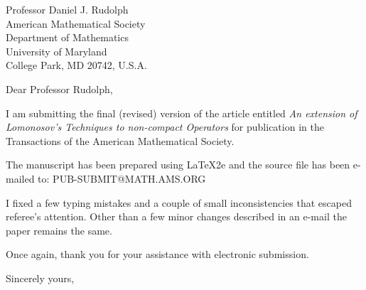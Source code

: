 \documentclass[12pt]{letter}
\begin{document}
\begin{letter}{
 Professor Daniel J. Rudolph   \\
 American Mathematical Society \\
 Department of Mathematics     \\
 University of Maryland        \\
 College Park, MD 20742, U.S.A. }

\opening{Dear Professor Rudolph,}
I am submitting the final (revised) version of the article entitled
{\em An extension of Lomonosov's Techniques to non-compact
Operators} for publication in the Transactions of the American
Mathematical Society.

The manuscript has been prepared using \LaTeX2e and the source file
has been e-mailed to: PUB-SUBMIT@MATH.AMS.ORG

I fixed a few typing mistakes and a couple of small inconsistencies
that escaped referee's attention. Other than a few minor changes
described in an e-mail the paper remains the same.

Once again, thank you for your assistance with electronic
submission.

\closing{Sincerely yours,}
\end{letter}
\end{document}
